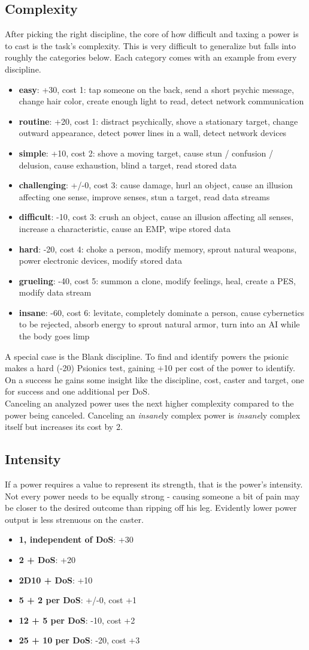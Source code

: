 \documentclass[12pt,a4paper,openany]{book}
\newcommand{\mod}[2]{\item \textbf{#1}: #2}
\begin{document}
	\subsection{Complexity}
	After picking the right discipline, the core of how difficult and taxing a power is to cast is the task’s complexity. This is very difficult to generalize but falls into roughly the categories below. Each category comes with an example from every discipline.
	\begin{itemize}
		\mod{easy}{+30, cost 1: tap someone on the back, send a short psychic message, change hair color, create enough light to read, detect network communication}
		\mod{routine}{+20, cost 1: distract psychically, shove a stationary target, change outward appearance, detect power lines in a wall, detect network devices}
		\mod{simple}{+10, cost 2: shove a moving target, cause stun / confusion / delusion, cause exhaustion, blind a target, read stored data}
		\mod{challenging}{+/-0, cost 3: cause damage, hurl an object, cause an illusion affecting one sense, improve senses, stun a target, read data streams}
		\mod{difficult}{-10, cost 3: crush an object, cause an illusion affecting all senses, increase a characteristic, cause an EMP, wipe stored data}
		\mod{hard}{-20, cost 4: choke a person, modify memory, sprout natural weapons, power electronic devices, modify stored data}
		\mod{grueling}{-40, cost 5: summon a clone, modify feelings, heal, create a PES, modify data stream}
		\mod{insane}{-60, cost 6: levitate, completely dominate a person, cause cybernetics to be rejected, absorb energy to sprout natural armor, turn into an AI while the body goes limp}
	\end{itemize}
	A special case is the Blank discipline. To find and identify powers the psionic makes a hard (-20) Psionics test, gaining +10 per cost of the power to identify. On a success he gains some insight like the discipline, cost, caster and target, one for success and one additional per DoS.\\
	Canceling an analyzed power uses the next higher complexity compared to the power being canceled. Canceling an \emph{insane}ly complex power is \emph{insane}ly complex itself but increases its cost by 2.
	\subsection{Intensity}
	If a power requires a value to represent its strength, that is the power’s intensity. Not every power needs to be equally strong - causing someone a bit of pain may be closer to the desired outcome than ripping off his leg. Evidently lower power output is less strenuous on the caster.
	\begin{itemize}
		\mod{1, independent of DoS}{+30}
		\mod{2 + DoS}{+20}
		\mod{2D10 + DoS}{+10}
		\mod{5 + 2 per DoS}{+/-0, cost +1}
		\mod{12 + 5 per DoS}{-10, cost +2}
		\mod{25 + 10 per DoS}{-20, cost +3}
	\end{itemize}
\end{document}
